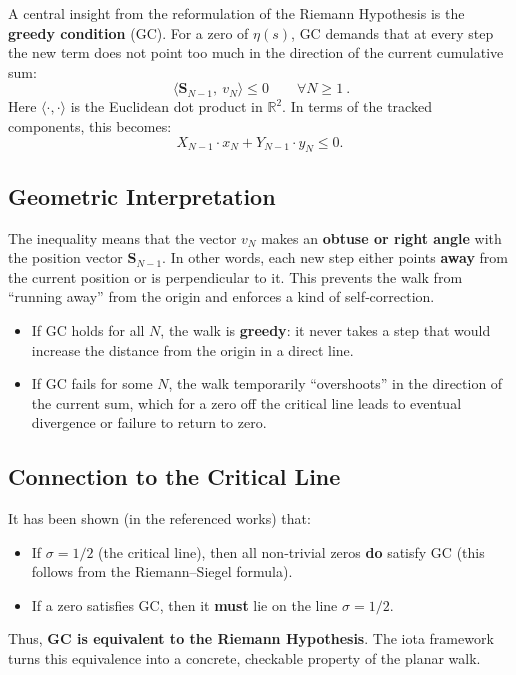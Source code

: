 \documentclass[12pt,a4paper]{article}
\begin{document}
A central insight from the reformulation of the Riemann Hypothesis is the \textbf{greedy condition} (GC). For a zero of \(\eta(s)\), GC demands that at every step the new term does not point too much in the direction of the current cumulative sum:
\[
\boxed{\ \langle \mathbf{S}_{N-1},\ v_N \rangle \le 0 \qquad \forall N \ge 1\ }.
\]
Here \(\langle \cdot,\cdot\rangle\) is the Euclidean dot product in \(\mathbb{R}^2\). In terms of the tracked components, this becomes:
\[
X_{N-1} \cdot x_N + Y_{N-1} \cdot y_N \le 0.
\]

\subsection*{Geometric Interpretation}
The inequality means that the vector \( v_N \) makes an \textbf{obtuse or right angle} with the position vector \(\mathbf{S}_{N-1}\). In other words, each new step either points \textbf{away} from the current position or is perpendicular to it. This prevents the walk from ``running away'' from the origin and enforces a kind of self‑correction.

\begin{itemize}
    \item If GC holds for all \( N \), the walk is \textbf{greedy}: it never takes a step that would increase the distance from the origin in a direct line.
    \item If GC fails for some \( N \), the walk temporarily ``overshoots'' in the direction of the current sum, which for a zero off the critical line leads to eventual divergence or failure to return to zero.
\end{itemize}

\subsection*{Connection to the Critical Line}
It has been shown (in the referenced works) that:
\begin{itemize}
    \item If \(\sigma = 1/2\) (the critical line), then all non‑trivial zeros \textbf{do} satisfy GC (this follows from the Riemann–Siegel formula).
    \item If a zero satisfies GC, then it \textbf{must} lie on the line \(\sigma = 1/2\).
\end{itemize}
Thus, \textbf{GC is equivalent to the Riemann Hypothesis}. The iota framework turns this equivalence into a concrete, checkable property of the planar walk.
\end{document}
